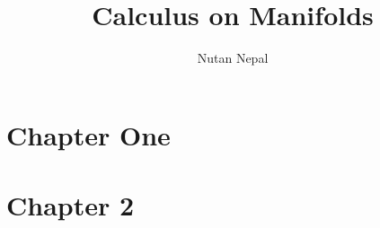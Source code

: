 
\title{Calculus on Manifolds}
\author{Nutan Nepal}



\maketitle
    \section*{Chapter One}
    \section*{}
        
    \section*{}
        
        
        \begin{questions}
            
            
            
            
            
        \end{questions}
    \section*{Chapter 2}
        \begin{questions}
            
            
            
            
        \end{questions}
    \section*{}
        
        \begin{questions}
            
            
            
        \end{questions}
    \section*{}
        \begin{questions}
            
            
            
        \end{questions}
